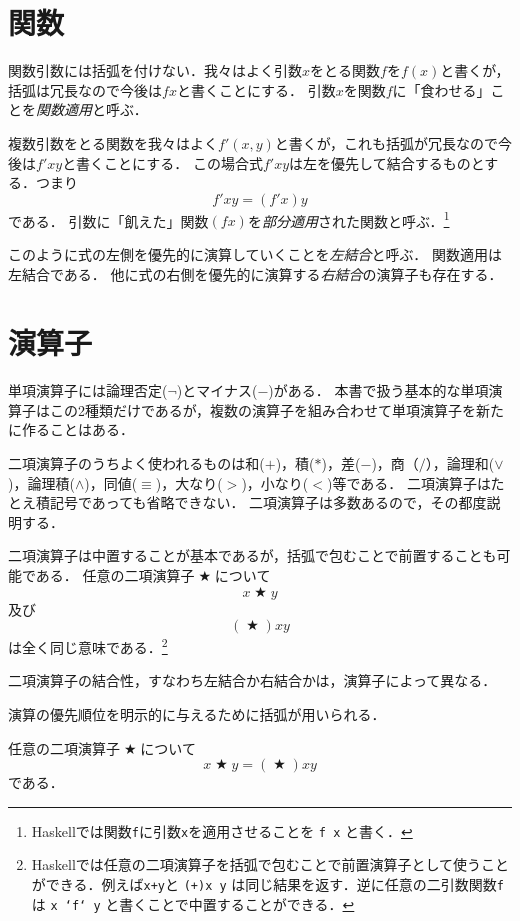 \documentclass[twocolumn]{jsbook}
\DeclareMathOperator{\mathAnyBinaryOperator}{\bigstar}
\newcommand{\keyword}[1]{\emph{#1}}
\newcommand{\code}[1]{\texttt{#1}}
\newenvironment{point}{\begin{screen}}{\end{screen}}
\begin{document}
\section{関数}

関数引数には括弧を付けない．我々はよく引数$x$をとる関数$f$を$f(x)$と書くが，括弧は冗長なので今後は$fx$と書くことにする．
引数$x$を関数$f$に「食わせる」ことを\keyword{関数適用}と呼ぶ．

複数引数をとる関数を我々はよく$f'(x,y)$と書くが，これも括弧が冗長なので今後は$f'xy$と書くことにする．
この場合式$f'xy$は左を優先して結合するものとする．つまり$$f'xy=(f'x)y$$である．
引数に「飢えた」関数$(fx)$を\keyword{部分適用}された関数と呼ぶ．\footnote{Haskellでは関数\code{f}に引数\code{x}を適用させることを \code{f x} と書く．}

このように式の左側を優先的に演算していくことを\keyword{左結合}と呼ぶ．
関数適用は左結合である．
他に式の右側を優先的に演算する\keyword{右結合}の演算子も存在する．

\section{演算子}

単項演算子には論理否定($\neg$)とマイナス($-$)がある．
本書で扱う基本的な単項演算子はこの2種類だけであるが，複数の演算子を組み合わせて単項演算子を新たに作ることはある．

二項演算子のうちよく使われるものは和($+$)，積($*$)，差($-$)，商（$/$），論理和($\vee$)，論理積($\wedge$)，同値($\equiv$)，大なり($>$)，小なり($<$)等である．
二項演算子はたとえ積記号であっても省略できない．
二項演算子は多数あるので，その都度説明する．

二項演算子は中置することが基本であるが，括弧で包むことで前置することも可能である．
任意の二項演算子$\mathAnyBinaryOperator$について$$x\mathAnyBinaryOperator y$$及び$$(\mathAnyBinaryOperator)xy$$は全く同じ意味である．\footnote{Haskellでは任意の二項演算子を括弧で包むことで前置演算子として使うことができる．例えば\code{x+y}と \code{(+)x y} は同じ結果を返す．逆に任意の二引数関数\code{f}は \code{x `f` y} と書くことで中置することができる．}

二項演算子の結合性，すなわち左結合か右結合かは，演算子によって異なる．

演算の優先順位を明示的に与えるために括弧が用いられる．

\begin{point}
任意の二項演算子$\mathAnyBinaryOperator$について$$x\mathAnyBinaryOperator y=(\mathAnyBinaryOperator)xy$$である．
\end{point}
\end{document}
